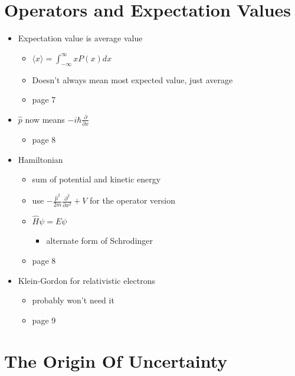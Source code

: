 \documentclass[a4paper,11pt,normalem]{article}
\begin{document}
\section{Operators and Expectation Values}\label{operators-and-expectation-values}

\begin{itemize}
\item
  Expectation value is average value
  \begin{itemize}
  \item
    \(\langle x \rangle = \int_{-\infty}^{\infty} xP(x) dx\)
  \item
    Doesn't always mean most expected value, just average
  \item
    page 7
  \end{itemize}
\item
  \(\hat{p}\) now means \(-i\hbar \frac{\partial}{\partial x}\)
  \begin{itemize}
  \item
    page 8
  \end{itemize}
\item
  Hamiltonian
  \begin{itemize}
  \item
    sum of potential and kinetic energy
  \item
    use \(-\frac{\hat{p}^2}{2m} \frac{\partial^2}{\partial x^2} + V\)
    for the operator version
  \item
    \(\hat{H} \psi = E \psi\)
    \begin{itemize}
    \item
      alternate form of Schrodinger
    \end{itemize}
  \item
    page 8
  \end{itemize}
\item
  Klein-Gordon for relativistic electrons
  \begin{itemize}
  \item
    probably won't need it
  \item
    page 9
  \end{itemize}
\end{itemize}

\section{The Origin Of Uncertainty}\label{the-origin-of-uncertainty}
\end{document}
